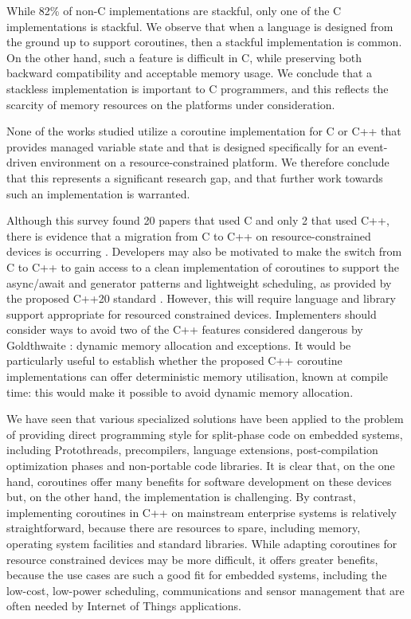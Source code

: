 While 82\% of non-C implementations are stackful, only one of the C implementations is stackful. We observe that when a language is designed from the ground up to support coroutines, then a stackful implementation is common. On the other hand, such a feature is difficult in C, while preserving both backward compatibility and acceptable memory usage. We conclude that a stackless implementation is important to C programmers, and this reflects the scarcity of memory resources on the platforms under consideration.

None of the works studied utilize a coroutine implementation for C or C++ that provides managed variable state and that is designed specifically for an event-driven environment on a resource-constrained platform. We therefore conclude that this represents a significant research gap, and that further work towards such an implementation is warranted.

Although this survey found 20 papers that used C and only 2 that used C++, there is evidence that a migration from C to C++ on resource-constrained devices is occurring \cite{AspenCore2017}. Developers may also be motivated to make the switch from C to C++ to gain access to a clean implementation of coroutines to support the async/await and generator patterns and lightweight scheduling, as provided by the proposed C++20 standard \cite{ISO2017}. However, this will require language and library support appropriate for resourced constrained devices. Implementers should consider ways to avoid two of the C++ features considered dangerous by Goldthwaite \cite{Goldthwaite2006}: dynamic memory allocation and exceptions. It would be particularly useful to establish whether the proposed C++ coroutine implementations can offer deterministic memory utilisation, known at compile time: this would make it possible to avoid dynamic memory allocation.

We have seen that various specialized solutions have been applied to the problem of providing direct programming style for split-phase code on embedded systems, including Protothreads, precompilers, language extensions, post-compilation optimization phases and non-portable code libraries. It is clear that, on the one hand, coroutines offer many benefits for software development on these devices but, on the other hand, the implementation is challenging. By contrast, implementing coroutines in C++ on mainstream enterprise systems is relatively straightforward, because there are resources to spare, including memory, operating system facilities and standard libraries. While adapting coroutines for resource constrained devices may be more difficult, it offers greater benefits, because the use cases are such a good fit for embedded systems, including the low-cost, low-power scheduling, communications and sensor management that are often needed by Internet of Things applications.

